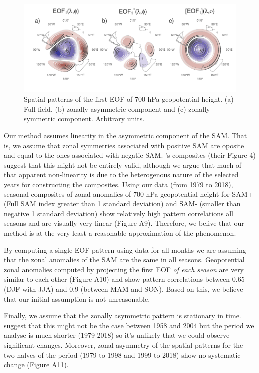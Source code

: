 \documentclass[]{ametsocV5}
\begin{document}
\begin{figure}
\includegraphics{method-1} \caption[Spatial patterns of the first EOF of 700 hPa geopotential height]{Spatial patterns of the first EOF of 700 hPa geopotential height. (a) Full field, (b) zonally asymmetric component and (c) zonally symmetric component. Arbitrary units.}\label{fig:method}
\end{figure}

Our method assumes linearity in the asymmetric component of the SAM.
That is, we assume that zonal symmetries associated with positive SAM
are oposite and equal to the ones associated with negatie SAM.
\citet{fogt2012}'s composites (their Figure 4) suggest that this might
not be entirely valid, although we argue that much of that apparent
non-linearity is due to the heterogenous nature of the selected years
for constructing the composites. Using our data (from 1979 to 2018),
seasonal composites of zonal anomalies of 700 hPa geopotential height
for SAM+ (Full SAM index greater than 1 standard deviation) and SAM-
(smaller than negative 1 standard deviation) show relatively high
pattern correlations all seasons and are visually very linear (Figure
A9). Therefore, we belive that our method is at the very least a
reasonable approximation of the phenomenon.

By computing a single EOF pattern using data for all months we are
assuming that the zonal anomalies of the SAM are the same in all
seasons. Geopotential zonal anomalies computed by projecting the first
EOF \emph{of each season} are very similar to each other (Figure A10)
and show pattern correlations between 0.65 (DJF with JJA) and 0.9
(between MAM and SON). Based on this, we believe that our initial
assumption is not unreasonable.

Finally, we assume that the zonally asymmetric pattern is stationary in
time. \citet{silvestri2009} suggest that this might not be the case
between 1958 and 2004 but the period we analyse is much shorter
(1979-2018) so it's unlikely that we could observe significant changes.
Moreover, zonal asymmetry of the spatial patterns for the two halves of
the period (1979 to 1998 and 1999 to 2018) show no systematic change
(Figure A11).
\end{document}
